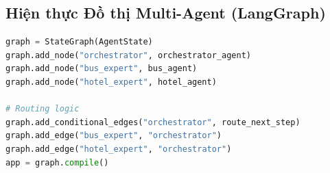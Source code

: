 \subsection{Hiện thực Đồ thị Multi-Agent (LangGraph)}
\begin{lstlisting}[language=Python, title=Khởi tạo State Graph]
graph = StateGraph(AgentState)
graph.add_node("orchestrator", orchestrator_agent)
graph.add_node("bus_expert", bus_agent)
graph.add_node("hotel_expert", hotel_agent)

# Routing logic
graph.add_conditional_edges("orchestrator", route_next_step)
graph.add_edge("bus_expert", "orchestrator")
graph.add_edge("hotel_expert", "orchestrator")
app = graph.compile()
\end{lstlisting}
